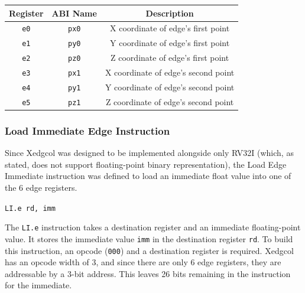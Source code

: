     \begin{table}[H]
    \begin{center}
    \begin{tabular}{|c|c|c|}
    \hline
    \textbf{Register} & \textbf{ABI Name} & \textbf{Description} \\
    \hline
    \texttt{e0}     & \texttt{px0}      & X coordinate of edge's first point \\
    \hline
    \texttt{e1}     & \texttt{py0}      & Y coordinate of edge's first point \\
    \hline
    \texttt{e2}     & \texttt{pz0}      & Z coordinate of edge's first point \\
    \hline
    \texttt{e3}     & \texttt{px1}      & X coordinate of edge's second point \\
    \hline
    \texttt{e4}     & \texttt{py1}      & Y coordinate of edge's second point \\
    \hline
    \texttt{e5}     & \texttt{pz1}      & Z coordinate of edge's second point \\
    \hline
    \end{tabular}
    \label{table:edge_registers}
    \end{center}
    \end{table}

    \subsubsection{Load Immediate Edge Instruction}
    Since Xedgcol was designed to be implemented alongside only RV32I (which, as stated, does not support floating-point binary representation), the Load Edge Immediate instruction was defined to load an immediate float value into one of the 6 edge registers. 

    \begin{center}
    \texttt{LI.e rd, imm}
    \end{center}

    The \texttt{LI.e} instruction takes a destination register and an immediate floating-point value. It stores the immediate value \texttt{imm} in the destination register \texttt{rd}.
    To build this instruction, an opcode (\texttt{000}) and a destination register is required. Xedgcol has an opcode width of 3, and since there are only 6 edge registers, they are addressable by a 3-bit address. This leaves 26 bits remaining in the instruction for the immediate. \\

